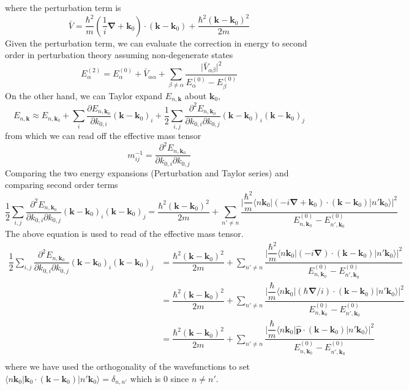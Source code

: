 \documentclass[aps,prb,onecolumn,notitlepage,showpacs,floatfix,superscriptaddress]{revtex4-1}
\newcommand{\bk}{{\bm k}}
\newcommand{\bkz}{{\bm k_0}}
\newcommand{\op}{\hat{\bm p}}
\newcommand{\bn}{{\bm \nabla}}
\begin{document}
where the perturbation term is
\begin{equation}
 \bar{V} =  \dfrac{\hbar^2}{m}\left( \dfrac{1}{i} \bn+ \bkz \right) \cdot  (\bk-\bkz) + \dfrac{\hbar^2  (\bk-\bkz)^2}{2m} 
\end{equation}
Given the perturbation term, we can evaluate the correction in energy to second order in perturbation theory assuming non-degenerate states
\begin{equation}
E^{(2)}_\alpha = E^{(0)}_\alpha + \bar{V}_{\alpha \alpha} + \sum_{\beta \neq \alpha} \dfrac{ \vert \bar{V}_{\alpha \beta} \vert^2}{E^{(0)}_\alpha - E^{(0)}_\beta}
\end{equation}
On the other hand, we can Taylor expand $E_{n,\bk}$ about $\bkz$,
\begin{equation}
E_{n,\bk} \approx E_{n,\bkz} + \sum_{i} \dfrac{\partial E_{n,\bkz}}{\partial k_{0,i}} (\bk-\bkz)_i + \dfrac{1}{2}\sum_{i,j} \dfrac{\partial^2 E_{n,\bkz}}{\partial k_{0,i}\partial k_{0,j}} (\bk-\bkz)_i  (\bk-\bkz)_j
\end{equation}
from which we can read off the effective mass tensor
\begin{equation}
m_{ij}^{-1} = \dfrac{\partial^2 E_{n,\bkz}}{\partial k_{0,i}\partial k_{0,j}}
\end{equation}
Comparing the two energy expansions (Perturbation and Taylor series) and comparing second order terms
\begin{equation}
\dfrac{1}{2}\sum_{i,j} \dfrac{\partial^2 E_{n,\bkz}}{\partial k_{0,i}\partial k_{0,j}} (\bk-\bkz)_i  (\bk-\bkz)_j =  \dfrac{\hbar^2  (\bk-\bkz)^2}{2m} + \sum_{n' \neq n} \dfrac{ \vert \dfrac{\hbar^2}{m} \langle n \bkz\vert ( -i \bn+ \bkz ) \cdot  (\bk-\bkz) \vert n' \bkz \rangle \vert^2}{E^{(0)}_{n,\bkz} - E^{(0)}_{n',\bkz}}  
\end{equation}
The above equation is used to read of the effective mass tensor.
\begin{equation}
\begin{split}
\dfrac{1}{2}\sum_{i,j} \dfrac{\partial^2 E_{n,\bkz}}{\partial k_{0,i}\partial k_{0,j}} (\bk-\bkz)_i  (\bk-\bkz)_j &=  \dfrac{\hbar^2  (\bk-\bkz)^2}{2m} + \sum_{n' \neq n} \dfrac{ \vert \dfrac{\hbar^2}{m} \langle n \bkz\vert ( -i \bn) \cdot  (\bk-\bkz) \vert n' \bkz \rangle \vert^2}{E^{(0)}_{n,\bkz} - E^{(0)}_{n',\bkz}}  \\
&=  \dfrac{\hbar^2  (\bk-\bkz)^2}{2m} + \sum_{n' \neq n} \dfrac{ \vert \dfrac{\hbar}{m} \langle n \bkz\vert ( \hbar \bn/i) \cdot  (\bk-\bkz) \vert n' \bkz \rangle \vert^2}{E^{(0)}_{n,\bkz} - E^{(0)}_{n',\bkz}}  \\
&=  \dfrac{\hbar^2  (\bk-\bkz)^2}{2m} + \sum_{n' \neq n} \dfrac{ \vert \dfrac{\hbar}{m} \langle n \bkz\vert \op\cdot  (\bk-\bkz) \vert n' \bkz \rangle \vert^2}{E^{(0)}_{n,\bkz} - E^{(0)}_{n',\bkz}}  \\
\end{split}
\end{equation}
where we have used the orthogonality of the wavefunctions to set $\langle n \bkz\vert \bkz \cdot  (\bk-\bkz) \vert n' \bkz \rangle = \delta_{n,n'}$ which is 0 since $n\neq n'$. \\
\end{document}

